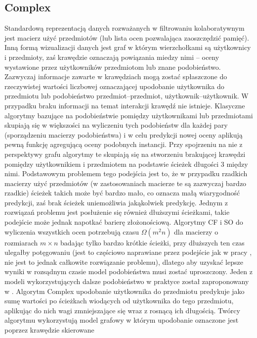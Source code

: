 \documentclass{pracamgr}
\begin{document}
   \subsection{Complex}
    Standardową reprezentacją danych rozważanych w filtrowaniu kolaboratywnym jest macierz użyć przedmiotów (lub lista ocen pozwalająca zaoszczędzić pamięć).
    Inną formą wizualizacji danych jest graf w którym wierzchołkami są użytkownicy i przedmioty, zaś krawędzie oznaczają powiązania miedzy nimi
    -- oceny wystawione przez użytkowników przedmiotom lub znane podobieństwo. Zazwyczaj informacje zawarte w krawędziach mogą zostać spłaszczone do
    rzeczywistej wartości liczbowej oznaczającej upodobanie użytkownika do przedmiotu lub podobieństwo przedmiot--przedmiot, użytkownik--użytkownik.
    W przypadku braku informacji na temat interakcji krawędź nie istnieje.
    Klasyczne algorytmy bazujące na podobieństwie pomiędzy użytkownikami lub przedmiotami skupiają się w większości na wyliczeniu tych podobieństw
    dla każdej pary (sporządzeniu macierzy podobieństwa) i w celu predykcji nowej oceny aplikują pewną funkcję agregującą oceny podobnych instancji.
    Przy spojrzeniu na nie z perspektywy grafu algorytmy te skupiają się na stworzeniu brakującej krawędzi pomiędzy użytkownikiem i przedmiotem na podstawie
    ścieżek długości 3 między nimi.\newline
    Podstawowym problemem tego podejścia jest to, że w przypadku rzadkich macierzy użyć przedmiotów (w zastosowaniach macierze te są zazwyczaj bardzo rzadkie)
    ścieżek takich może być bardzo mało, co oznacza małą wiarygodność predykcji, zaś brak ścieżek uniemożliwia jakąkolwiek predykcję.
    Jednym z rozwiązań problemu jest posłużenie się również dłuższymi ścieżkami, takie podejście może jednak napotkać barierę złożonościową.
    Algorytmy CF i SO do wyliczenia wszystkich ocen potrzebują czasu $\Omega(m^2n)$ dla macierzy o rozmiarach $m\times n$ badając tylko bardzo krótkie ścieżki,
    przy dłuższych ten czas ulegałby potęgowaniu
    (jest to częściowo naprawiane przez podejście jak w pracy \cite{221}, nie jest to jednak całkowite rozwiązanie problemu),
    dlatego aby uzyskać lepsze wyniki w rozsądnym czasie model podobieństwa musi zostać uproszczony.
    Jeden z modeli wykorzystujących dalsze podobieństwo w praktyce został zaproponowany w \cite{205}. Algorytm Complex upodobanie użytkownika do przedmiotu
    predykuje jako sumę wartości po ścieżkach wiodących od użytkownika do tego przedmiotu, aplikując do nich wagi zmniejszające się wraz z rosnącą ich długością.
    Twórcy algorytmu wykorzystują model grafowy w którym upodobanie oznaczone jest poprzez krawędzie skierowane
\end{document}
